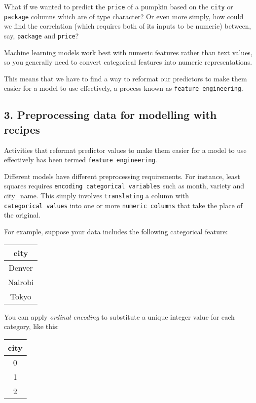 \documentclass[
]{article}
\begin{document}
What if we wanted to predict the \texttt{price} of a pumpkin based on
the \texttt{city} or \texttt{package} columns which are of type
character? Or even more simply, how could we find the correlation (which
requires both of its inputs to be numeric) between, say,
\texttt{package} and \texttt{price}? 🤷🤷

Machine learning models work best with numeric features rather than text
values, so you generally need to convert categorical features into
numeric representations.

This means that we have to find a way to reformat our predictors to make
them easier for a model to use effectively, a process known as
\texttt{feature\ engineering}.

\hypertarget{preprocessing-data-for-modelling-with-recipes}{%
\subsection{3. Preprocessing data for modelling with recipes
👩‍🍳👨‍🍳}\label{preprocessing-data-for-modelling-with-recipes}}

Activities that reformat predictor values to make them easier for a
model to use effectively has been termed \texttt{feature\ engineering}.

Different models have different preprocessing requirements. For
instance, least squares requires
\texttt{encoding\ categorical\ variables} such as month, variety and
city\_name. This simply involves \texttt{translating} a column with
\texttt{categorical\ values} into one or more \texttt{numeric\ columns}
that take the place of the original.

For example, suppose your data includes the following categorical
feature:

\begin{longtable}[]{@{}c@{}}
\toprule
city \\
\midrule
\endhead
Denver \\
Nairobi \\
Tokyo \\
\bottomrule
\end{longtable}

You can apply \emph{ordinal encoding} to substitute a unique integer
value for each category, like this:

\begin{longtable}[]{@{}c@{}}
\toprule
city \\
\midrule
\endhead
0 \\
1 \\
2 \\
\bottomrule
\end{longtable}
\end{document}
